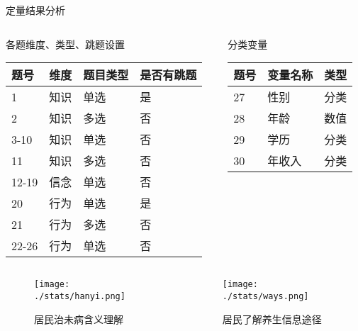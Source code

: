 \begin{frame}[allowframebreaks]{定量结果分析}
\begin{columns}
\begin{column}{0.7\textwidth}
    \begin{block}{各题维度、类型、跳题设置}
\begin{longtable}[]{@{}llll@{}}
    
    题号 & 维度 & 题目类型 & 是否有跳题\tabularnewline
    \hline
    \endhead
    1 & 知识 & 单选 & 是\tabularnewline
    2 & 知识 & 多选 & 否\tabularnewline
    3-10 & 知识 & 单选 & 否\tabularnewline
    11 & 知识 & 多选 & 否\tabularnewline
    12-19 & 信念 & 单选 & 否\tabularnewline
    20 & 行为 & 单选 & 是\tabularnewline
    21 & 行为 & 多选 & 否\tabularnewline
    22-26 & 行为 & 单选 & 否\tabularnewline
    \hline
\end{longtable}
\end{block}
\end{column}
\begin{column}{0.6\textwidth}
\begin{block}{分类变量}
\begin{longtable}[]{@{}lll@{}}
    
    题号 & 变量名称 & 类型\tabularnewline
    \hline
    \endhead
    27 & 性别 & 分类\tabularnewline
    28 & 年龄 & 数值\tabularnewline
    29 & 学历 & 分类\tabularnewline
    30 & 年收入 & 分类\tabularnewline
    \hline
\end{longtable}
\end{block}
\end{column}
\end{columns}
    \begin{columns}
    \begin{column}{0.6\textwidth}
\begin{figure}[h]
    \texttt{[image: ./stats/hanyi.png]}
    \caption{居民治未病含义理解}
\end{figure}
    \end{column}
    \begin{column}{0.6\textwidth}
        \begin{figure}[h]
            \texttt{[image: ./stats/ways.png]}
            \caption{居民了解养生信息途径}
        \end{figure} 
    \end{column}
\end{columns}


\end{frame}

